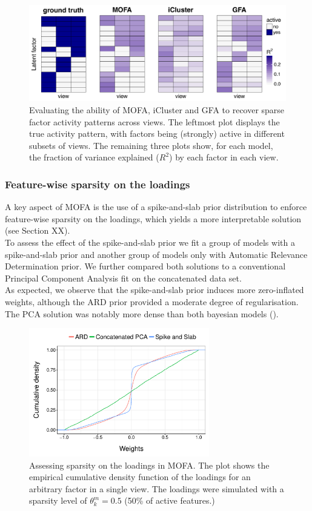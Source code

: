 \begin{figure}[H]
	\centering 	
	\includegraphics[width=1.0\textwidth]{MOFA_group_sparsity}
	\caption{Evaluating the ability of MOFA, iCluster and GFA to recover sparse factor activity patterns across views. The leftmost plot displays the true activity pattern, with factors being (strongly) active in different subsets of views. The remaining three plots show, for each model, the fraction of variance explained ($R^2$) by each factor in each view.}
	\label{fig:MOFA_group_sparsity}
\end{figure}

\subsubsection{Feature-wise sparsity on the loadings}
A key aspect of MOFA is the use of a spike-and-slab prior distribution to enforce feature-wise sparsity on the loadings, which yields a more interpretable solution (see Section XX).\\
To assess the effect of the spike-and-slab prior we fit a group of models with a spike-and-slab prior and another group of models only with Automatic Relevance Determination prior. We further compared both solutions to a conventional Principal Component Analysis fit on the concatenated data set.\\
As expected, we observe that the spike-and-slab prior induces more zero-inflated weights, although the ARD prior provided a moderate degree of regularisation. The PCA solution was notably more dense than both bayesian models ().

\begin{figure}[H]
	\centering 	
	\includegraphics[width=0.7\textwidth]{MOFA_sparsity}
	\caption{Assessing sparsity on the loadings in MOFA. The plot shows the empirical cumulative density function of the loadings for an arbitrary factor in a single view. The loadings were simulated with a sparsity level of $\theta_k^m=0.5$ (50\% of active features.)
	}
	\label{fig:MOFA_sparsity}
\end{figure}


